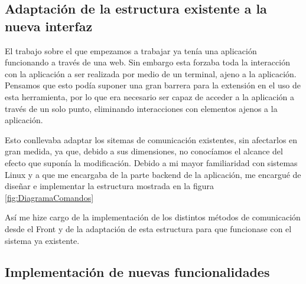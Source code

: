 \subsection*{Adaptación de la estructura existente a la nueva interfaz}

El trabajo sobre el que empezamos a trabajar ya tenía una aplicación funcionando a través de una web. Sin embargo esta forzaba toda la interacción con la aplicación a ser realizada por medio de un terminal, ajeno a la aplicación. Pensamos que esto podía suponer una gran barrera para la extensión en el uso de esta herramienta, por lo que era necesario ser capaz de acceder a la aplicación a través de un solo punto, eliminando interacciones con elementos ajenos a la aplicación.

Esto conllevaba adaptar los sitemas de comunicación existentes, sin afectarlos en gran medida, ya que, debido a sus dimensiones, no conocíamos el alcance del efecto que suponía la modificación. Debido a mi mayor familiaridad con sistemas Linux y a que me encargaba de la parte backend de la aplicación, me encargué de diseñar e implementar la estructura mostrada en la figura \ref{fig:DiagramaComandos}

Así me hize cargo de la implementación de los distintos métodos de comunicación desde el Front y de la adaptación de esta estructura para que funcionase con el sistema ya existente.

\subsection*{Implementación de nuevas funcionalidades}

